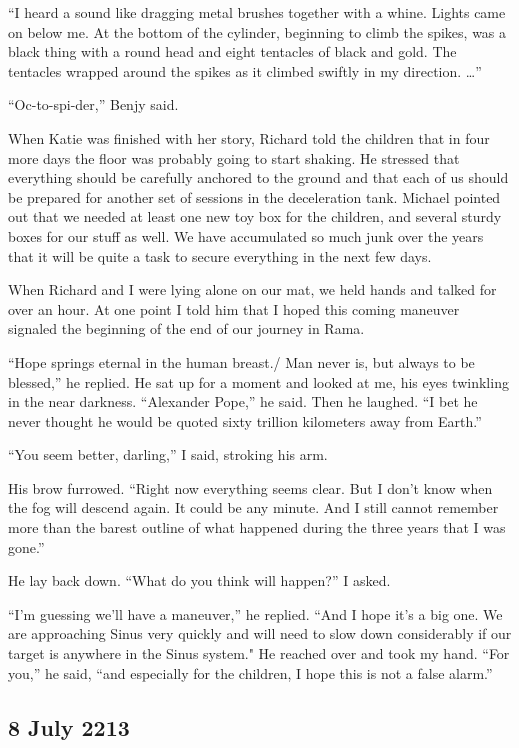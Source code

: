\documentclass[]{article}
\begin{document}
{“I heard a sound like dragging metal brushes together with a whine.  Lights came on below me.  At the bottom of the cylinder, beginning to climb the spikes, was a black thing with a round head and eight tentacles of black and gold.  The tentacles wrapped around the spikes as it climbed swiftly in my direction.  …”

“Oc-to-spi-der,” Benjy said.

When Katie was finished with her story, Richard told the children that in four more days the floor was probably going to start shaking.  He stressed that everything should be carefully anchored to the ground and that each of us should be prepared for another set of sessions in the deceleration tank.  Michael pointed out that we needed at least one new toy box for the children, and several sturdy boxes for our stuff as well.  We have accumulated so much junk over the years that it will be quite a task to secure everything in the next few days.

When Richard and I were lying alone on our mat, we held hands and talked for over an hour.  At one point I told him that I hoped this coming maneuver signaled the beginning of the end of our journey in Rama.

“Hope springs eternal in the human breast./ Man never is, but always to be blessed,” he replied.  He sat up for a moment and looked at me, his eyes twinkling in the near darkness.  “Alexander Pope,” he said.  Then he laughed.  “I bet he never thought he would be quoted sixty trillion kilometers away from Earth.”

“You seem better, darling,” I said, stroking his arm.

His brow furrowed.  “Right now everything seems clear.  But I don’t know when the fog will descend again.  It could be any minute.  And I still cannot remember more than the barest outline of what happened during the three years that I was gone.”

He lay back down.  “What do you think will happen?” I asked.

“I’m guessing we’ll have a maneuver,” he replied.  “And I hope it’s a big one.  We are approaching Sinus very quickly and will need to slow down considerably if our target is anywhere in the Sinus system."  He reached over and took my hand.  “For you,” he said, “and especially for the children, I hope this is not a false alarm.”

\subsection*{8 July 2213}

}
\end{document}
